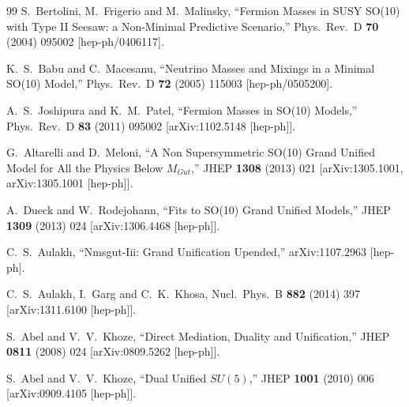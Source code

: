 \documentclass[a4paper,12pt]{article}
\begin{document}
\begin{thebibliography}{99}
S.~Bertolini, M.~Frigerio and M.~Malinsky,
``Fermion Masses in SUSY SO(10) with Type II Seesaw: a Non-Minimal Predictive Scenario,''
Phys.\ Rev.\ D {\bf 70} (2004) 095002
[hep-ph/0406117].


K.~S.~Babu and C.~Macesanu,
``Neutrino Masses and Mixings in a Minimal SO(10) Model,''
Phys.\ Rev.\ D {\bf 72} (2005) 115003
[hep-ph/0505200].


A.~S.~Joshipura and K.~M.~Patel,
``Fermion Masses in SO(10) Models,''
Phys.\ Rev.\ D {\bf 83} (2011) 095002
[arXiv:1102.5148 [hep-ph]].


G.~Altarelli and D.~Meloni,
``A Non Supersymmetric SO(10) Grand Unified Model for All the Physics Below $M_{Gut}$,''
JHEP {\bf 1308} (2013) 021
[arXiv:1305.1001, arXiv:1305.1001 [hep-ph]].


A.~Dueck and W.~Rodejohann,
``Fits to SO(10) Grand Unified Models,''
JHEP {\bf 1309} (2013) 024
[arXiv:1306.4468 [hep-ph]].

C.~S.~Aulakh,
``Nmsgut-Iii: Grand Unification Upended,''
arXiv:1107.2963 [hep-ph].

  C.~S.~Aulakh, I.~Garg and C.~K.~Khosa,
  Nucl.\ Phys.\ B {\bf 882} (2014) 397
  [arXiv:1311.6100 [hep-ph]].

S.~Abel and V.~V.~Khoze,
``Direct Mediation, Duality and Unification,''
JHEP {\bf 0811} (2008) 024
[arXiv:0809.5262 [hep-ph]].


S.~Abel and V.~V.~Khoze,
``Dual Unified $SU(5)$,''
JHEP {\bf 1001} (2010) 006
[arXiv:0909.4105 [hep-ph]].

\end{thebibliography}
\end{document}

